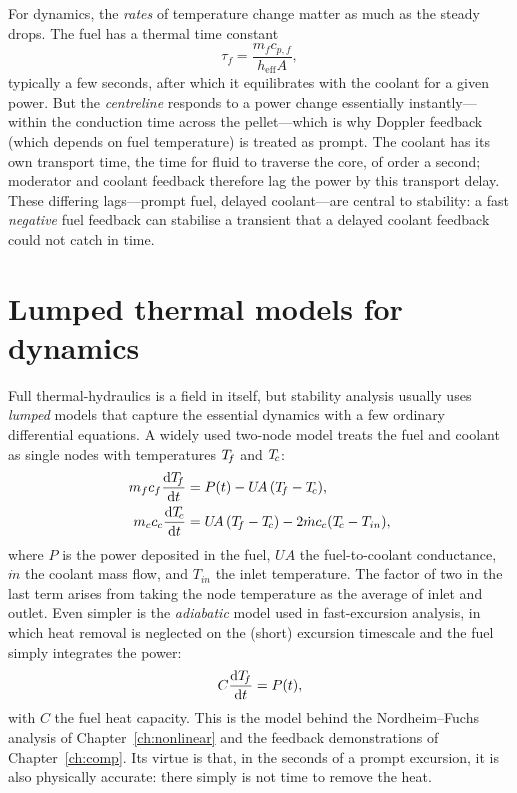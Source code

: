 For dynamics, the \emph{rates} of temperature change matter as much as the steady
drops. The fuel has a thermal time constant
\begin{equation}
\tau_f = \frac{m_f c_{p,f}}{h_{\text{eff}}A},
\end{equation}
typically a few seconds, after which it equilibrates with the coolant for a given
power. But the \emph{centreline} responds to a power change essentially
instantly---within the conduction time across the pellet---which is why Doppler
feedback (which depends on fuel temperature) is treated as prompt. The coolant
has its own transport time, the time for fluid to traverse the core, of order a
second; moderator and coolant feedback therefore lag the power by this transport
delay. These differing lags---prompt fuel, delayed coolant---are central to
stability: a fast \emph{negative} fuel feedback can stabilise a transient that a
delayed coolant feedback could not catch in time.


\section{Lumped thermal models for dynamics}

Full thermal-hydraulics is a field in itself, but stability analysis usually uses
\emph{lumped} models that capture the essential dynamics with a few ordinary
differential equations. A widely used two-node model treats the fuel and coolant
as single nodes with temperatures $T_{\!f}$ and $T_{\!c}$:
\begin{align}
m_f c_f \frac{\dd \Tf}{\dd t} &= P(t) - U\!A\,(\Tf - \Tc),\\
m_c c_c \frac{\dd \Tc}{\dd t} &= U\!A\,(\Tf - \Tc) - 2\dot m c_c (\Tc - T_{in}),
\end{align}
where $P$ is the power deposited in the fuel, $U\!A$ the fuel-to-coolant
conductance, $\dot m$ the coolant mass flow, and $T_{in}$ the inlet temperature.
The factor of two in the last term arises from taking the node temperature as the
average of inlet and outlet. Even simpler is the \emph{adiabatic} model used in
fast-excursion analysis, in which heat removal is neglected on the (short)
excursion timescale and the fuel simply integrates the power:
\begin{equation}
C\frac{\mathrm{d} T_{\!f}}{\mathrm{d} t} = P(t),
\label{eq:adiabatic}
\end{equation}
with $C$ the fuel heat capacity. This is the model behind the Nordheim--Fuchs
analysis of Chapter~\ref{ch:nonlinear} and the feedback demonstrations of
Chapter~\ref{ch:comp}. Its virtue is that, in the seconds of a prompt excursion,
it is also physically accurate: there simply is not time to remove the heat.

